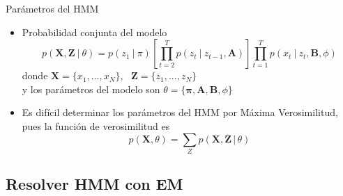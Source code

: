 \begin{frame}{Parámetros del HMM}
  \begin{itemize}
    \itemsep1em
    \item \alert{Probabilidad conjunta del modelo}
      \begin{equation}
        p(\mathbf{X}, \mathbf{Z} ~|~ \theta)        
          = p(z_1 ~|~ \pi) \left[ \prod_{t=2}^T p(z_t ~|~ z_{t-1}, \mathbf{A}) \right]
          \prod_{t=1}^T p(x_t ~|~ z_t, \mathbf{B}, \phi)
      \end{equation}      
      donde $\mathbf{X} = \lbrace x_1, ..., x_N \rbrace$,~ $\mathbf{Z} = \lbrace z_1, ..., z_N \rbrace$ \\
      y los parámetros del modelo son $\theta = \lbrace \bm{\pi}, \mathbf{A}, \mathbf{B}, \phi \rbrace$

    \item Es difícil determinar los parámetros del HMM por Máxima Verosimilitud, pues la función de verosimilitud es 
      \begin{equation}
        p(\mathbf{X}, \theta) = \sum_Z p(\mathbf{X}, \mathbf{Z} \,|\, \theta)
        \label{eqn:3-1}
      \end{equation}
  \end{itemize}
\end{frame}    

\subsection{Resolver HMM con EM}

